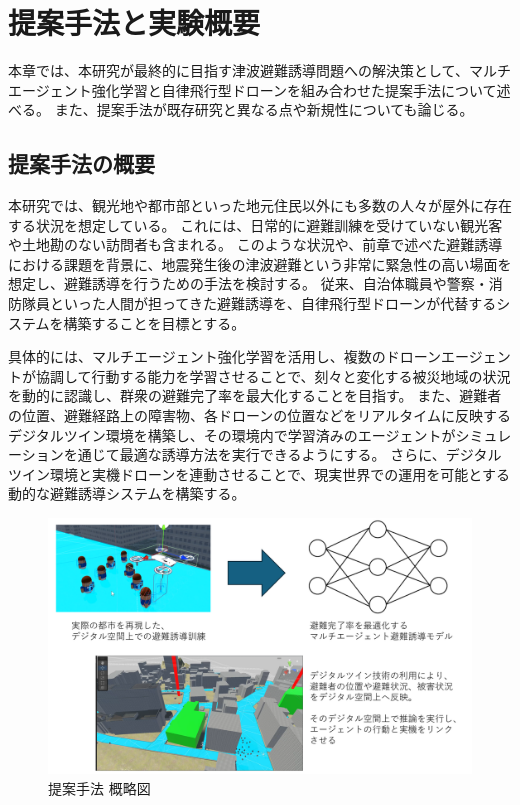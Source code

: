 \chapter{提案手法と実験概要}  
本章では、本研究が最終的に目指す津波避難誘導問題への解決策として、マルチエージェント強化学習と自律飛行型ドローンを組み合わせた提案手法について述べる。
また、提案手法が既存研究と異なる点や新規性についても論じる。

\section{提案手法の概要} 
\label{sec:sug} 
本研究では、観光地や都市部といった地元住民以外にも多数の人々が屋外に存在する状況を想定している。
これには、日常的に避難訓練を受けていない観光客や土地勘のない訪問者も含まれる。
このような状況や、前章で述べた避難誘導における課題を背景に、地震発生後の津波避難という非常に緊急性の高い場面を想定し、避難誘導を行うための手法を検討する。
従来、自治体職員や警察・消防隊員といった人間が担ってきた避難誘導を、自律飛行型ドローンが代替するシステムを構築することを目標とする。

具体的には、マルチエージェント強化学習を活用し、複数のドローンエージェントが協調して行動する能力を学習させることで、刻々と変化する被災地域の状況を動的に認識し、群衆の避難完了率を最大化することを目指す。
また、避難者の位置、避難経路上の障害物、各ドローンの位置などをリアルタイムに反映するデジタルツイン環境を構築し、その環境内で学習済みのエージェントがシミュレーションを通じて最適な誘導方法を実行できるようにする。
さらに、デジタルツイン環境と実機ドローンを連動させることで、現実世界での運用を可能とする動的な避難誘導システムを構築する。

\begin{figure}[H] 
  \centering 
  \includegraphics[width=1.0\textwidth]{Figures/2024-12-06 182816.png}
  \caption{提案手法 概略図} 
  \label{fig:01} 
\end{figure}

